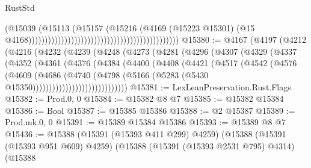 \begin{lexlean}{RustStd}
\begin{coremodule}
                                                                                    (@15039
                                                                                      (@15113
                                                                                        (@15157
                                                                                          (@15216
                                                                                            (@4169
                                                                                              (@15223
                                                                                                @15301)
                                                                                              (@15
                                                                                                @4168))))))))))))))))))))))))))))))))))))))))))))))
@15380 := @4167
    (@4197
      (@4212
        (@4216
          (@4232
            (@4239
              (@4248
                (@4273
                  (@4281
                    (@4296
                      (@4307
                        (@4329
                          (@4337
                            (@4352
                              (@4361
                                (@4376
                                  (@4384
                                    (@4400
                                      (@4408
                                        (@4421
                                          (@4517
                                            (@4542
                                              (@4576
                                                (@4609
                                                  (@4686
                                                    (@4740
                                                      (@4798
                                                        (@5166
                                                          (@5283
                                                            (@5430
                                                              @15350)))))))))))))))))))))))))))))
@15381 := LexLeanPreservation.Rust.Flags
@15382 := Prod.{0, 0}
@15384 := @15382 @8 @7
@15385 := @15382 @15384
@15386 := Bool
@15387 := @15385 @15386
@15388 := @2 @15387
@15389 := Prod.mk.{0, 0}
@15391 := @15389 @15384 @15386
@15393 := @15389 @8 @7
@15436 := @15388
    (@15391 (@15393 @411 @299) @4259)
    (@15388
      (@15391 (@15393 @951 @609) @4259)
      (@15388
        (@15391 (@15393 @2531 @795) @4314)
        (@15388

\end{coremodule}
\end{lexlean}
